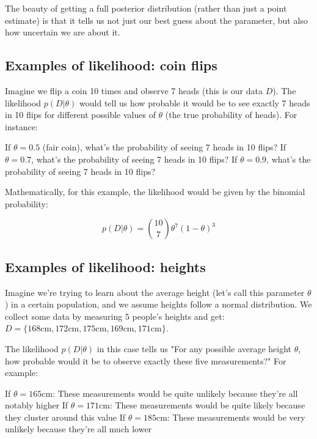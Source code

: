 
The beauty of getting a full posterior distribution (rather than just a point estimate)
is that it tells us not just our best guess about the parameter, but also how uncertain we are about it.



\subsection{Examples of likelihood: coin flips}

Imagine we flip a coin 10 times and observe 7 heads (this is our data $D$). The likelihood $p(D|\theta)$ would tell us how probable it would be to see exactly 7 heads in 10 flips for different possible values of $\theta$ (the true probability of heads).
For instance:

If $\theta = 0.5$ (fair coin), what's the probability of seeing 7 heads in 10 flips?
If $\theta = 0.7$, what's the probability of seeing 7 heads in 10 flips?
If $\theta = 0.9$, what's the probability of seeing 7 heads in 10 flips?

Mathematically, for this example, the likelihood would be given by the binomial probability:

$$
p(D|\theta) = \binom{10}{7} \theta^7 \left(1-\theta\right)^{3}
$$

\subsection{Examples of likelihood: heights}

Imagine we're trying to learn about the average height (let's call this parameter $\theta$) in a certain population, and we assume heights follow a normal distribution. We collect some data by measuring 5 people's heights and get:
$D = \{ 168\text{cm}, 172\text{cm}, 175\text{cm}, 169\text{cm}, 171\text{cm} \}$.

The likelihood $p(D|\theta)$ in this case tells us "For any possible average height $\theta$,
how probable would it be to observe exactly these five measurements?"
For example:

If $\theta = 165\text{cm}$: These measurements would be quite unlikely because they're all notably higher
If $\theta = 171\text{cm}$: These measurements would be quite likely because they cluster around this value
If $\theta = 185\text{cm}$: These measurements would be very unlikely because they're all much lower

